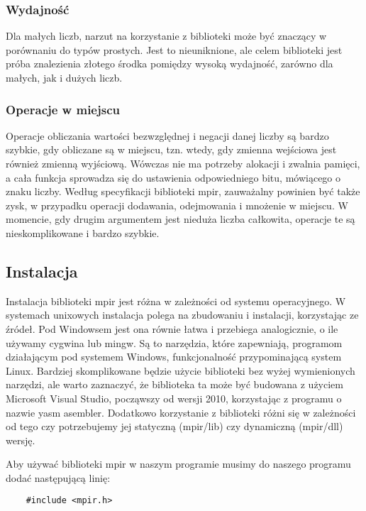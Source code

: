 \documentclass[oneside,a4paper]{book}
\begin{document}
	\subsubsection{Wydajność}
	Dla małych liczb, narzut na korzystanie z biblioteki może być znaczący w porównaniu do typów prostych. Jest to nieuniknione, ale celem biblioteki jest próba znalezienia złotego środka pomiędzy wysoką wydajność, zarówno dla małych, jak i dużych liczb. 
	
	\subsubsection{Operacje w miejscu}
	Operacje obliczania wartości bezwzględnej i negacji danej liczby są bardzo szybkie, gdy obliczane są w miejscu, tzn. wtedy, gdy zmienna wejściowa jest również zmienną wyjściową. Wówczas nie ma potrzeby alokacji i zwalnia pamięci, a cała funkcja sprowadza się do ustawienia odpowiedniego bitu, mówiącego o znaku liczby. Według specyfikacji biblioteki mpir, zauważalny powinien być także zysk, w przypadku operacji dodawania, odejmowania i mnożenie w miejscu. W momencie, gdy drugim argumentem jest nieduża liczba całkowita, operacje te są nieskomplikowane i bardzo szybkie.
	
	\subsection{Instalacja}
	
	Instalacja biblioteki mpir jest różna w zależności od systemu operacyjnego. W systemach unixowych instalacja polega na zbudowaniu i instalacji, korzystając ze źródeł. Pod Windowsem jest ona równie łatwa i przebiega analogicznie, o ile używamy cygwina lub mingw. Są to narzędzia, które zapewniają, programom działającym pod systemem Windows, funkcjonalność przypominającą system Linux. Bardziej skomplikowane będzie użycie biblioteki bez wyżej wymienionych narzędzi, ale warto zaznaczyć, że biblioteka ta może być budowana z użyciem Microsoft Visual Studio, począwszy od wersji 2010, korzystając z programu o nazwie yasm asembler. Dodatkowo korzystanie z biblioteki różni się w zależności od tego czy potrzebujemy jej statyczną (mpir/lib) czy dynamiczną (mpir/dll) wersję.
	
	Aby używać biblioteki mpir w naszym programie musimy do naszego programu dodać następującą linię:
	\begin{lstlisting}
	#include <mpir.h>
	\end{lstlisting}
	
\end{document}

